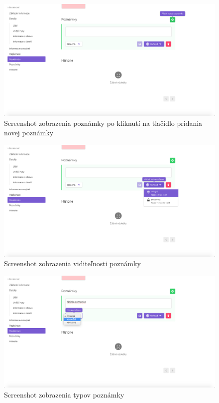\begin{figure}[H]
	\includegraphics[width=1.0\textwidth]{media/priloha/zviera/poznamka/1.png}
	\caption{Screenshot zobrazenia poznámky po kliknutí na tlačidlo pridania novej poznámky}
\end{figure}

\begin{figure}[H]
	\includegraphics[width=1.0\textwidth]{media/priloha/zviera/poznamka/2.png}
	\caption{Screenshot zobrazenia viditeľnosti poznámky}
\end{figure}

\begin{figure}[H]
	\includegraphics[width=1.0\textwidth]{media/priloha/zviera/poznamka/3.png}
	\caption{Screenshot zobrazenia typov poznámky}
\end{figure}


